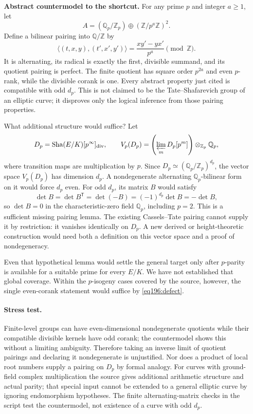 \documentclass[11pt,a4paper]{article}
\newcommand{\Z}{\mathbb{Z}}
\newcommand{\Q}{\mathbb{Q}}
\numberwithin{equation}{section}
\begin{document}
\textbf{Abstract countermodel to the shortcut.} For any prime $p$ and integer $a\ge1$, let
\[
 A=(\Q_p/\Z_p)\oplus(\Z/p^a\Z)^2.
\]
Define a bilinear pairing into $\Q/\Z$ by
\[
 \langle(t,x,y),(t',x',y')\rangle=\frac{xy'-yx'}{p^a}\pmod\Z.
\]
It is alternating, its radical is exactly the first, divisible summand, and its quotient pairing is perfect. The finite quotient has square order $p^{2a}$ and even $p$-rank, while the divisible corank is one. Every abstract property just cited is compatible with odd $d_p$. This is not claimed to be the Tate--Shafarevich group of an elliptic curve; it disproves only the logical inference from those pairing properties.

What additional structure would suffice? Let
\[
 D_p=\operatorname{Sha}(E/K)[p^\infty]_{\rm div},\qquad
 V_p(D_p)=\left(\varprojlim_m D_p[p^m]\right)\otimes_{\Z_p}\Q_p,
\]
where transition maps are multiplication by $p$. Since
$D_p\simeq(\Q_p/\Z_p)^{d_p}$, the vector space $V_p(D_p)$ has dimension $d_p$. A nondegenerate alternating $\Q_p$-bilinear form on it would force $d_p$ even. For odd $d_p$, its matrix $B$ would satisfy
\[
 \det B=\det B^{\mathsf T}=\det(-B)=(-1)^{d_p}\det B=-\det B,
\]
so $\det B=0$ in the characteristic-zero field $\Q_p$, including $p=2$. This is a sufficient missing pairing lemma. The existing Cassels--Tate pairing cannot supply it by restriction: it vanishes identically on $D_p$. A new derived or height-theoretic construction would need both a definition on this vector space and a proof of nondegeneracy.

Even that hypothetical lemma would settle the general target only after $p$-parity is available for a suitable prime for every $E/K$. We have not established that global coverage. Within the $p$-isogeny cases covered by the source, however, the single even-corank statement would suffice by \eqref{eq196:defect}.

\paragraph{Stress test.}
Finite-level groups can have even-dimensional nondegenerate quotients while their compatible divisible kernels have odd corank; the countermodel shows this without a limiting ambiguity. Therefore taking an inverse limit of quotient pairings and declaring it nondegenerate is unjustified. Nor does a product of local root numbers supply a pairing on $D_p$ by formal analogy. For curves with ground-field complex multiplication the source gives additional arithmetic structure and actual parity; that special input cannot be extended to a general elliptic curve by ignoring endomorphism hypotheses. The finite alternating-matrix checks in the script test the countermodel, not existence of a curve with odd $d_p$.
\end{document}
